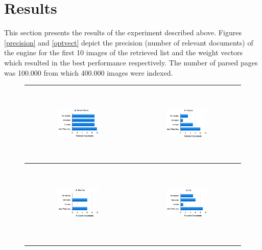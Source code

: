 \documentclass[a4paper]{article}
\begin{document}

\section{Results}
This section presents the results of the experiment described above. Figures \ref{precision} and \ref{optvect} depict the precision (number of relevant documents) of the engine for the first 10 images of the retrieved list and the weight vectors which resulted in the best performance respectively. 
The number of parsed pages was 100.000 from which 400.000 images were indexed. 

\begin{figure}
\begin{center}
\begin{tabular}{ c | c }
\\
\includegraphics[width=0.4\textwidth,height=10em]{01BarackObama} & \includegraphics[width=0.4\textwidth,height=10em]{02Summer} \\  \hline \\
\includegraphics[width=0.4\textwidth,height=10em]{03BlueSky} &
\includegraphics[width=0.4\textwidth,height=10em]{04Cat} \\  \hline \\

\end{tabular}
\end{center}
\end{figure}
\end{document}
